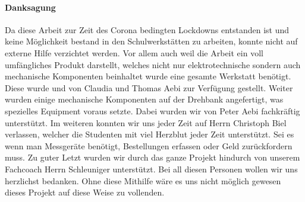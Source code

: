 \paragraph{Danksagung}\mbox{}

Da diese Arbeit zur Zeit des Corona bedingten Lockdowns entstanden ist und keine Möglichkeit bestand in den Schulwerkstätten zu arbeiten, konnte nicht auf externe Hilfe verzichtet werden. Vor allem auch weil die Arbeit ein voll umfängliches Produkt darstellt, welches nicht nur elektrotechnische sondern auch mechanische Komponenten beinhaltet wurde eine gesamte Werkstatt benötigt. Diese wurde und von Claudia und Thomas Aebi zur Verfügung gestellt. Weiter wurden einige mechanische Komponenten auf der Drehbank angefertigt, was spezielles Equipment voraus setzte. Dabei wurden wir von Peter Aebi fachkräftig unterstützt. Im weiteren konnten wir uns jeder Zeit auf Herrn Christoph Biel verlassen, welcher die Studenten mit viel Herzblut jeder Zeit unterstützt. Sei es wenn man Messgeräte benötigt, Bestellungen erfassen oder Geld zurückfordern muss. Zu guter Letzt wurden wir durch das ganze Projekt hindurch von unserem Fachcoach Herrn Schleuniger unterstützt. Bei all diesen Personen wollen wir uns herzlichst bedanken. Ohne diese Mithilfe wäre es uns nicht möglich gewesen dieses Projekt auf diese Weise zu vollenden.     

\newpage




